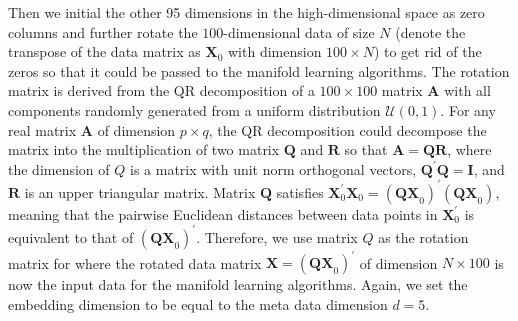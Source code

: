 \documentclass[11pt,a4paper,]{article}
\begin{document}
Then we initial the other 95 dimensions in the high-dimensional space as zero columns and further rotate the \(100\)-dimensional data of size \(N\) (denote the transpose of the data matrix as \(\pmb{X}_0\) with dimension \(100 \times N\)) to get rid of the zeros so that it could be passed to the manifold learning algorithms.
The rotation matrix is derived from the QR decomposition of a \(100\times 100\) matrix \(\pmb{A}\) with all components randomly generated from a uniform distribution \(\mathcal{U}(0,1)\).
For any real matrix \(\pmb{A}\) of dimension \(p\times q\), the QR decomposition could decompose the matrix into the multiplication of two matrix \(\pmb{Q}\) and \(\pmb{R}\) so that \(\pmb{A} = \pmb{QR}\), where the dimension of \(Q\) is a matrix with unit norm orthogonal vectors, \(\pmb{Q}^\prime \pmb{Q} = \pmb{I}\), and \(\pmb{R}\) is an upper triangular matrix. Matrix \(\pmb{Q}\) satisfies
\(\pmb{X}_0^\prime \pmb{X}_0=(\pmb{QX}_0)^\prime(\pmb{QX}_0)\), meaning that the pairwise Euclidean distances between data points in \(\pmb{X}_0^\prime\) is equivalent to that of \((\pmb{QX}_0)^\prime\). Therefore, we use matrix \(Q\) as the rotation matrix for where the rotated data matrix \(\pmb{X} = (\pmb{QX}_0)^\prime\) of dimension \(N \times 100\) is now the input data for the manifold learning algorithms. Again, we set the embedding dimension to be equal to the meta data dimension \(d=5\).
\end{document}
